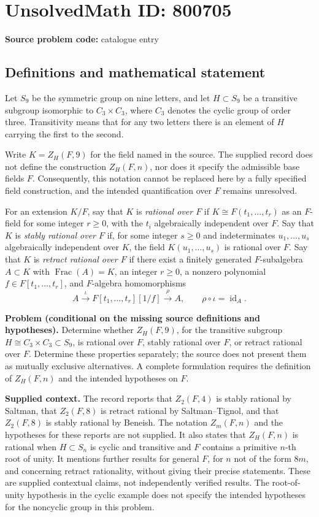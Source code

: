 \documentclass[11pt]{article}
\begin{document}
\section*{UnsolvedMath ID: 800705}
\textbf{Source problem code:} catalogue entry
\subsection{Definitions and mathematical statement}
Let \(S_9\) be the symmetric group on nine letters, and let \(H\subset S_9\) be a transitive subgroup isomorphic to \(C_3\times C_3\), where \(C_3\) denotes the cyclic group of order three. Transitivity means that for any two letters there is an element of \(H\) carrying the first to the second.

Write \(K=Z_H(F,9)\) for the field named in the source. The supplied record does not define the construction \(Z_H(F,n)\), nor does it specify the admissible base fields \(F\). Consequently, this notation cannot be replaced here by a fully specified field construction, and the intended quantification over \(F\) remains unresolved.

For an extension \(K/F\), say that \(K\) is \emph{rational over \(F\)} if \(K\cong F(t_1,\ldots,t_r)\) as an \(F\)-field for some integer \(r\geq 0\), with the \(t_i\) algebraically independent over \(F\). Say that \(K\) is \emph{stably rational over \(F\)} if, for some integer \(s\geq 0\) and indeterminates \(u_1,\ldots,u_s\) algebraically independent over \(K\), the field \(K(u_1,\ldots,u_s)\) is rational over \(F\). Say that \(K\) is \emph{retract rational over \(F\)} if there exist a finitely generated \(F\)-subalgebra \(A\subset K\) with \(\operatorname{Frac}(A)=K\), an integer \(r\geq 0\), a nonzero polynomial \(f\in F[t_1,\ldots,t_r]\), and \(F\)-algebra homomorphisms
\[
 A\xrightarrow{\iota}F[t_1,\ldots,t_r][1/f]\xrightarrow{\rho}A,
 \qquad \rho\circ\iota=\operatorname{id}_A.
\]

\textbf{Problem (conditional on the missing source definitions and hypotheses).} Determine whether \(Z_H(F,9)\), for the transitive subgroup \(H\cong C_3\times C_3\subset S_9\), is rational over \(F\), stably rational over \(F\), or retract rational over \(F\). Determine these properties separately; the source does not present them as mutually exclusive alternatives. A complete formulation requires the definition of \(Z_H(F,n)\) and the intended hypotheses on \(F\).

\textbf{Supplied context.} The record reports that \(Z_2(F,4)\) is stably rational by Saltman, that \(Z_2(F,8)\) is retract rational by Saltman--Tignol, and that \(Z_2(F,8)\) is stably rational by Beneish. The notation \(Z_m(F,n)\) and the hypotheses for these reports are not supplied. It also states that \(Z_H(F,n)\) is rational when \(H\subset S_n\) is cyclic and transitive and \(F\) contains a primitive \(n\)-th root of unity. It mentions further results for general \(F\), for \(n\) not of the form \(8m\), and concerning retract rationality, without giving their precise statements. These are supplied contextual claims, not independently verified results. The root-of-unity hypothesis in the cyclic example does not specify the intended hypotheses for the noncyclic group in this problem.
\end{document}
